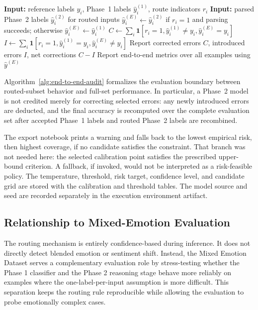 \documentclass{ieeeaccess}
\begin{document}
\begin{algorithm}[t]
\caption{Audited end-to-end evaluation of routed predictions}
\label{alg:end-to-end-audit}
\footnotesize
\begin{algorithmic}[1]
\State \textbf{Input:} reference labels $y_i$, Phase~1 labels $\hat{y}^{(1)}_i$, route indicators $r_i$
\State \textbf{Input:} parsed Phase~2 labels $\hat{y}^{(2)}_i$ for routed inputs
    \State $\hat{y}^{(E)}_i \gets \hat{y}^{(2)}_i$ if $r_i=1$ and parsing succeeds; otherwise $\hat{y}^{(E)}_i \gets \hat{y}^{(1)}_i$
\EndFor
\State $C\gets\sum_i\mathbf{1}[r_i=1,\hat{y}^{(1)}_i\ne y_i,\hat{y}^{(E)}_i=y_i]$
\State $I\gets\sum_i\mathbf{1}[r_i=1,\hat{y}^{(1)}_i=y_i,\hat{y}^{(E)}_i\ne y_i]$
\State Report corrected errors $C$, introduced errors $I$, net corrections $C-I$
\State Report end-to-end metrics over all examples using $\hat{y}^{(E)}$
\end{algorithmic}
\end{algorithm}

Algorithm~\ref{alg:end-to-end-audit} formalizes the evaluation boundary between routed-subset behavior and full-set performance. In particular, a Phase~2 model is not credited merely for correcting selected errors: any newly introduced errors are deducted, and the final accuracy is recomputed over the complete evaluation set after accepted Phase~1 labels and routed Phase~2 labels are recombined.

The export notebook prints a warning and falls back to the lowest empirical risk, then highest coverage, if no candidate satisfies the constraint. That branch was not needed here: the selected calibration point satisfies the prescribed upper-bound criterion. A fallback, if invoked, would not be interpreted as a risk-feasible policy. The temperature, threshold, risk target, confidence level, and candidate grid are stored with the calibration and threshold tables. The model source and seed are recorded separately in the execution environment artifact.

\subsection{Relationship to Mixed-Emotion Evaluation}

The routing mechanism is entirely confidence-based during inference. It does not directly detect blended emotion or sentiment shift. Instead, the Mixed Emotion Dataset serves a complementary evaluation role by stress-testing whether the Phase 1 classifier and the Phase 2 reasoning stage behave more reliably on examples where the one-label-per-input assumption is more difficult. This separation keeps the routing rule reproducible while allowing the evaluation to probe emotionally complex cases.
\end{document}
